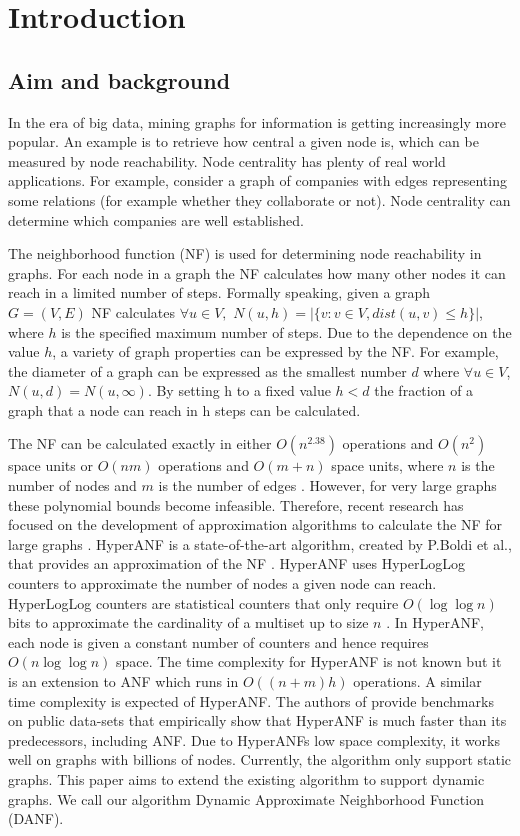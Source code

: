 \chapter{Introduction}

\section{Aim and background}
In the era of big data, mining graphs for information is getting increasingly more popular. An example is to retrieve how central a given node is, which can be measured by node reachability. Node centrality has plenty of real world applications. For example, consider a graph of companies with edges representing some relations (for example whether they collaborate or not). Node centrality can determine which companies are well established. 

The neighborhood function (NF) is used for determining node reachability in graphs. For each node in a graph the NF calculates how many other nodes it can reach in a limited number of steps. Formally speaking, given a graph $G = (V,E)$ NF calculates $\forall u \in V,$ $N(u,h) = |\{v : v \in V, dist(u,v) \leq h \}|$, where $h$ is the specified maximum number of steps. Due to the dependence on the value $h$, a variety of graph properties can be expressed by the NF. For example, the diameter of a graph can be expressed as the smallest number $d$ where $ \forall u \in V$, $N(u,d) = N(u,\infty)$. By setting h to a fixed value $h < d$ the fraction of a graph that a node can reach in h steps can be calculated.

The NF can be calculated exactly in either $O(n^{2.38})$ operations and $O(n^2)$ space units or $O(nm)$ operations and $O(m + n)$ space units, where $n$ is the number of nodes and $m$ is the number of edges \cite{Palmer01}. However, for very large graphs these polynomial bounds become infeasible. Therefore, recent research has focused on the development of approximation algorithms to calculate the NF for large graphs \cite{Palmer01,hyperanf,anf}. HyperANF is a state-of-the-art algorithm, created by P.Boldi et al., that provides an approximation of the NF \cite{hyperanf}. HyperANF uses HyperLogLog counters to approximate the number of nodes a given node can reach. HyperLogLog counters are statistical counters that only require $O( \log\log n)$ bits to approximate the cardinality of a multiset up to size $n$ \cite{hyperloglog}. In HyperANF, each node is given a constant number of counters and hence requires $O(n \log\log n)$ space. The time complexity for HyperANF is not known but it is an extension to ANF which runs in $O((n+m)h)$ operations. A similar time complexity is expected of HyperANF. The authors of \cite{hyperanf} provide benchmarks on public data-sets that empirically show that HyperANF is much faster than its predecessors, including ANF. Due to HyperANFs low space complexity, it works well on graphs with billions of nodes. Currently, the algorithm only support  static graphs. This paper aims to extend the existing algorithm to support dynamic graphs. We call our algorithm Dynamic Approximate Neighborhood Function (DANF).

